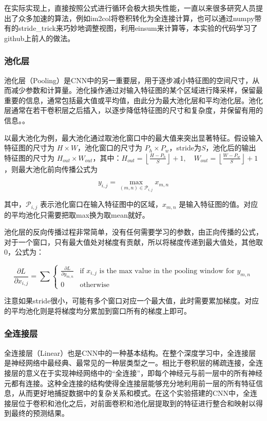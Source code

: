 在实际实现上，直接按照公式进行循环会极大损失性能，一直以来很多研究人员提出了众多加速的算法，例如im2col将卷积转化为全连接计算\cite{dukhan2019indirect}，也可以通过numpy带有的stride\_trick来巧妙地调整视图，利用einsum来计算等，本实验的代码学习了github上前人的做法\cite{cTensor}。

\subsubsection{池化层}

池化层（Pooling）是CNN中的另一重要层，用于逐步减小特征图的空间尺寸，从而减少参数和计算量。池化操作通过对输入特征图的某个区域进行降采样，保留最重要的信息，通常包括最大值或平均值，由此分为最大池化层和平均池化层。池化层通常在若干卷积层之后插入，以逐步降低特征图的尺寸和复杂度，并保留有用的信息。。

以最大池化为例，最大池化通过取池化窗口中的最大值来突出显著特征。假设输入特征图的尺寸为 $H \times W$，池化窗口的尺寸为 $P_h \times P_w$，stride为$S$，池化后的输出特征图的尺寸为 $H_{out} \times W_{out}$，其中：$ H_{out} = \left\lfloor \frac{H - P_h}{S} \right\rfloor + 1 ,\quad W_{out} = \left\lfloor \frac{W - P_w}{S} \right\rfloor + 1 $，则最大池化前向传播公式为

\[ 
y_{i,j} = \max_{(m,n) \in \mathcal{P}_{i,j}} x_{m,n} 
\]

其中，$\mathcal{P}_{i,j}$ 表示池化窗口在输入特征图中的区域，$x_{m,n}$ 是输入特征图的值。对应的平均池化只需要把取max换为取mean就好。

池化层的反向传播过程非常简单，没有任何需要学习的参数，由正向传播的公式，对于一个窗口，只有最大值处对梯度有贡献，所以将梯度传递到最大值处，其他取0，公式为：

\[
\frac{\partial L}{\partial x_{i,j}} = \sum \begin{cases} 
\frac{\partial L}{\partial y_{m,n}} & \text{if } x_{i,j} \text{ is the max value in the pooling window for } y_{m,n} \\
0 & \text{otherwise}
\end{cases}
\] 

注意如果stride很小，可能有多个窗口对应一个最大值，此时需要累加梯度。对应的平均池化则是将梯度均分累加到窗口所有的梯度上即可。

\subsubsection{全连接层}

全连接层（Linear）也是CNN中的一种基本结构。在整个深度学习中，全连接层是神经网络中最经典、最常见的一种层类型之一。相比于卷积层的稀疏连接，全连接层的意义在于实现神经网络中的“全连接”，即每个神经元与前一层中的所有神经元都有连接。这种全连接的结构使得全连接层能够充分地利用前一层的所有特征信息，从而更好地捕捉数据中的复杂关系和模式。在这个实验搭建的CNN中，全连接层位于卷积和池化之后，对前面卷积和池化层提取到的特征进行整合和映射以得到最终的预测结果。

